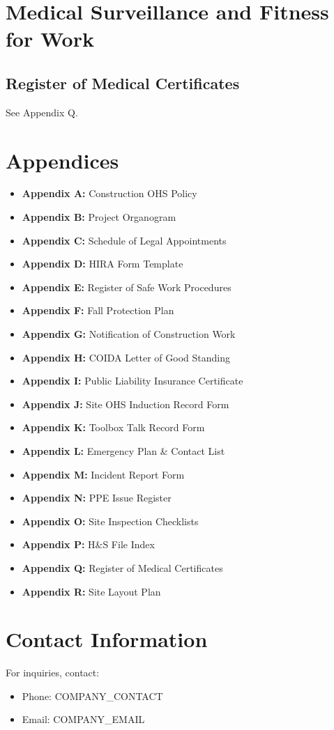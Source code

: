 \documentclass[12pt]{article}
\begin{document}
\section{Medical Surveillance and Fitness for Work}

\subsection{Register of Medical Certificates}
See Appendix Q.

\section{Appendices}
\begin{itemize}
    \item \textbf{Appendix A:} Construction OHS Policy
    \item \textbf{Appendix B:} Project Organogram
    \item \textbf{Appendix C:} Schedule of Legal Appointments
    \item \textbf{Appendix D:} HIRA Form Template
    \item \textbf{Appendix E:} Register of Safe Work Procedures
    \item \textbf{Appendix F:} Fall Protection Plan
    \item \textbf{Appendix G:} Notification of Construction Work
    \item \textbf{Appendix H:} COIDA Letter of Good Standing
    \item \textbf{Appendix I:} Public Liability Insurance Certificate
    \item \textbf{Appendix J:} Site OHS Induction Record Form
    \item \textbf{Appendix K:} Toolbox Talk Record Form
    \item \textbf{Appendix L:} Emergency Plan \& Contact List
    \item \textbf{Appendix M:} Incident Report Form
    \item \textbf{Appendix N:} PPE Issue Register
    \item \textbf{Appendix O:} Site Inspection Checklists
    \item \textbf{Appendix P:} H\&S File Index
    \item \textbf{Appendix Q:} Register of Medical Certificates
    \item \textbf{Appendix R:} Site Layout Plan
\end{itemize}

\section{Contact Information}
For inquiries, contact:
\begin{itemize}
    \item Phone: {{COMPANY_CONTACT}}
    \item Email: {{COMPANY_EMAIL}}
\end{itemize}
\end{document}
